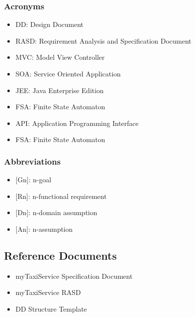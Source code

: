 \subsubsection{Acronyms}
\begin{itemize}
	\item DD: Design Document
	\item RASD: Requirement Analysis and Specification Document
	\item MVC: Model View Controller
	\item SOA: Service Oriented Application
	\item JEE: Java Enterprise Edition
	\item FSA: Finite State Automaton
	\item API: Application Programming Interface
	\item FSA: Finite State Automaton
\end{itemize}
\subsubsection{Abbreviations}
\begin{itemize}
\item {[}Gn{]}: n-goal 
\item {[}Rn{]}: n-functional requirement
\item {[}Dn{]}: n-domain assumption
\item {[}An{]}: n-assumption
\end{itemize}
\subsection{Reference Documents}
\begin{itemize}
	\item myTaxiService Specification Document
	\item myTaxiService RASD
	\item DD Structure Template
\end{itemize}
